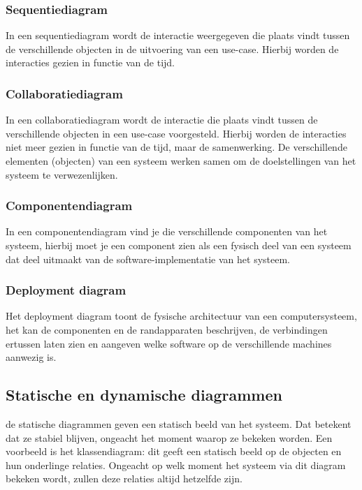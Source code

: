 \subsubsection{Sequentiediagram}

In een sequentiediagram wordt de interactie weergegeven die plaats vindt tussen de verschillende objecten in de uitvoering van een use-case. Hierbij worden de interacties gezien in functie van de tijd.

\subsubsection{Collaboratiediagram}

In een collaboratiediagram wordt de interactie die plaats vindt tussen de verschillende objecten in een use-case voorgesteld. Hierbij worden de interacties niet meer gezien in functie van de tijd, maar de samenwerking.
De verschillende elementen (objecten) van een systeem werken samen om de doelstellingen van het systeem te verwezenlijken.

\subsubsection{Componentendiagram}

In een componentendiagram vind je die verschillende componenten van het systeem, hierbij moet je een component zien als een fysisch deel van een systeem dat deel uitmaakt van de software-implementatie van het systeem.

\subsubsection{Deployment diagram}

Het deployment diagram toont de fysische architectuur van een computersysteem, het kan de componenten en de randapparaten beschrijven, de verbindingen ertussen laten zien en aangeven welke software op de verschillende machines aanwezig is.
\newpage
\subsection{Statische en dynamische diagrammen}

de statische diagrammen geven een statisch beeld van het systeem. Dat betekent dat ze stabiel blijven, ongeacht het moment waarop ze bekeken worden. Een voorbeeld is het klassendiagram: dit geeft een statisch beeld op de objecten en hun onderlinge relaties. Ongeacht op welk moment het systeem via dit diagram bekeken wordt, zullen deze relaties altijd hetzelfde zijn.


